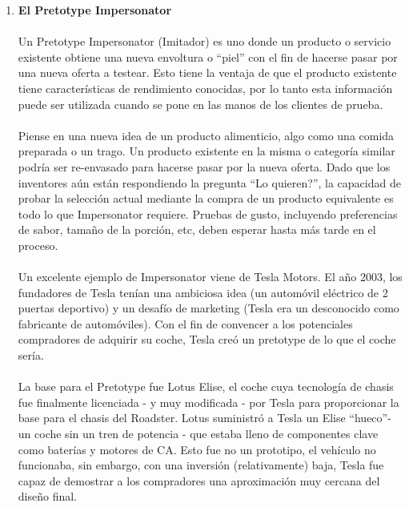 \documentclass{article}
\begin{document}
\begin{enumerate}
\item \textbf{El Pretotype Impersonator}
\\ \\
Un Pretotype Impersonator (Imitador) es uno donde un producto o servicio existente obtiene una nueva envoltura o ``piel'' con el fin de hacerse pasar por una nueva oferta a testear. Esto tiene la ventaja de que el producto existente tiene caracter\'isticas de rendimiento conocidas, por lo tanto esta informaci\'on puede ser utilizada cuando se pone en las manos de los clientes de prueba.
\\ \\
Piense en una nueva idea de un producto alimenticio, algo como una comida preparada o un trago. Un producto existente en la misma o categor\'ia similar podr\'ia ser re-envasado para hacerse pasar por la nueva oferta. Dado que los inventores a\'un est\'an respondiendo la pregunta ``Lo quieren?'', la capacidad de probar la selecci\'on actual mediante la compra de un producto equivalente es todo lo que Impersonator requiere. Pruebas de gusto, incluyendo preferencias de sabor, tama\~no de la porci\'on, etc, deben esperar hasta m\'as tarde en el proceso.
\\ \\
Un excelente ejemplo de Impersonator viene de Tesla Motors. El a\~no 2003, los fundadores de Tesla ten\'ian una ambiciosa idea (un autom\'ovil el\'ectrico de 2 puertas deportivo) y un desaf\'io de marketing (Tesla era un desconocido como fabricante de autom\'oviles). Con el fin de convencer a los potenciales compradores de adquirir su coche, Tesla cre\'o un pretotype de lo que el coche ser\'ia.
\\ \\
La base para el Pretotype fue Lotus Elise, el coche cuya tecnolog\'ia de chasis fue finalmente licenciada - y muy modificada - por Tesla para proporcionar la base para el chasis del Roadster. Lotus suministr\'o a Tesla un Elise ``hueco''- un coche sin un tren de potencia - que estaba lleno de componentes clave como bater\'ias y motores de CA. Esto fue no un prototipo, el veh\'iculo no funcionaba, sin embargo, con una inversi\'on (relativamente) baja, Tesla fue capaz de demostrar a los compradores una aproximaci\'on muy cercana del dise\~no final.


\end{enumerate}
\end{document}
